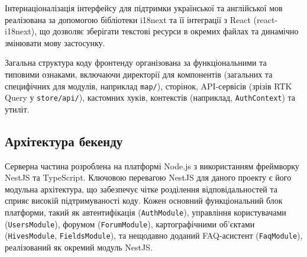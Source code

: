 Інтернаціоналізація інтерфейсу для підтримки української та англійської мов реалізована за допомогою бібліотеки i18next \cite{i18next} та її інтеграції з React (react-i18next), що дозволяє зберігати текстові ресурси в окремих файлах та динамічно змінювати мову застосунку.

Загальна структура коду фронтенду організована за функціональними та типовими ознаками, включаючи директорії для компонентів (загальних та специфічних для модулів, наприклад \texttt{map/}), сторінок, API-сервісів (зрізів RTK Query у \texttt{store/api/}), кастомних хуків, контекстів (наприклад, \texttt{AuthContext}) та утиліт.

\subsection{Архітектура бекенду}
Серверна частина розроблена на платформі Node.js з використанням фреймворку NestJS \cite{nestjs} та TypeScript. Ключовою перевагою NestJS для даного проекту є його модульна архітектура, що забезпечує чітке розділення відповідальностей та сприяє високій підтримуваності коду. Кожен основний функціональний блок платформи, такий як автентифікація (\texttt{AuthModule}), управління користувачами (\texttt{UsersModule}), форумом (\texttt{ForumModule}), картографічними об'єктами (\texttt{HivesModule}, \texttt{FieldsModule}), та нещодавно доданий FAQ-асистент (\texttt{FaqModule}), реалізований як окремий модуль NestJS.

